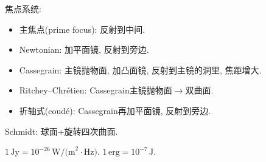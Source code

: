 焦点系统:
\begin{itemize}
    \item 主焦点(prime focus): 反射到中间.
    \item Newtonian: 加平面镜, 反射到旁边.
    \item Cassegrain: 主镜抛物面, 加凸面镜, 反射到主镜的洞里, 焦距增大.
    \item Ritchey--Chr\'etien: Cassegrain主镜抛物面$\to$双曲面.
    \item 折轴式(coud\'e): Cassegrain再加平面镜, 反射到旁边.
\end{itemize}

Schmidt: 球面+旋转四次曲面.

$1\,\text{Jy}=10^{-26}\,\text{W/(m}^2\!\cdot\text{Hz)}$. $1\,\text{erg}=10^{-7}\,\text{J}$.
